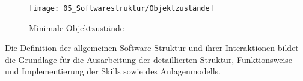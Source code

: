 	\begin{figure}[h!]
		\centering
		\texttt{[image: 05\_Softwarestruktur/Objektzustände]}
		\captionsetup{justification=centering}
		\caption{Minimale Objektzustände}
		\label{fig:Minimale_Objektzustände}
	\end{figure}
	\vspace{3mm}
	
	Die Definition der allgemeinen Software-Struktur und ihrer Interaktionen bildet die Grundlage für die Ausarbeitung der detaillierten Struktur, Funktionsweise und Implementierung der Skills sowie des Anlagenmodells.
	
	
	